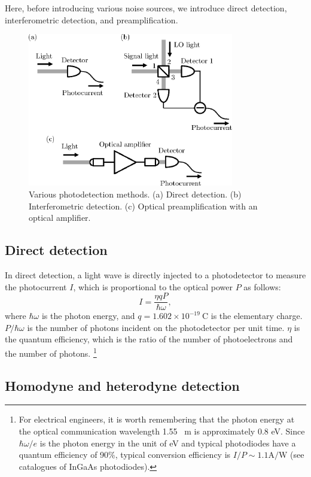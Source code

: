 \documentclass{book}
\begin{document}
Here, before introducing various noise sources, we introduce direct detection, interferometric detection, and preamplification.

\begin{figure}
  \centering
  \includegraphics[width=9cm]{fig/2-1_photodetection.eps}
  \caption{Various photodetection methods. (a) Direct detection. (b) Interferometric detection. (c) Optical preamplification with an optical amplifier.}
  \label{fig:photodetection}
\end{figure}


\subsection{Direct detection}
In direct detection, a light wave is directly injected to a photodetector to measure the photocurrent $I$, which is proportional to the optical power $P$ as follows:
\begin{equation}
	I = \frac{\eta q P}{\hbar \omega},
	\nonumber
\end{equation}
where $\hbar \omega$ is the photon energy, and $q = 1.602 \times 10^{-19} \ \mathrm{C}$ is the elementary charge. $P / \hbar \omega$ is the number of photons incident on the photodetector per unit time. $\eta$ is the quantum efficiency, which is the ratio of the number of photoelectrons and the number of photons.
\footnote{For electrical engineers, it is worth remembering that the photon energy at the optical communication wavelength 1.55 \ \textmu m is approximately 0.8 eV. Since $\hbar \omega / e$ is the photon energy in the unit of eV and typical photodiodes have a quantum efficiency of 90\%, typical conversion efficiency is $I/P \sim 1.1 \mathrm{A/W}$ (see catalogues of InGaAs photodiodes).}

\subsection{Homodyne and heterodyne detection}
\end{document}
